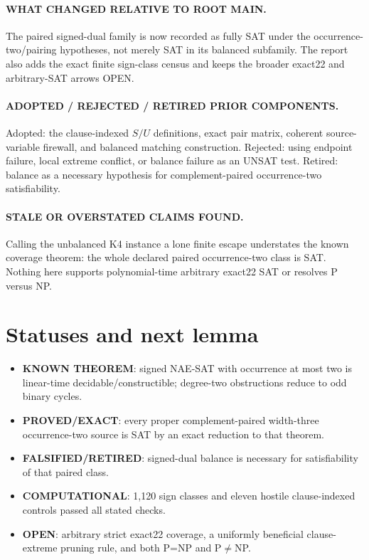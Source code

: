 \documentclass[11pt]{article}
\newcommand{\PROVED}{\textbf{PROVED/EXACT}}
\newcommand{\KNOWN}{\textbf{KNOWN THEOREM}}
\newcommand{\COMP}{\textbf{COMPUTATIONAL}}
\newcommand{\OPEN}{\textbf{OPEN}}
\newcommand{\FALSE}{\textbf{FALSIFIED/RETIRED}}
\begin{document}
\paragraph{WHAT CHANGED RELATIVE TO ROOT MAIN.}
The paired signed-dual family is now recorded as fully SAT under the
occurrence-two/pairing hypotheses, not merely SAT in its balanced subfamily.
The report also adds the exact finite sign-class census and keeps the broader
exact22 and arbitrary-SAT arrows OPEN.

\paragraph{ADOPTED / REJECTED / RETIRED PRIOR COMPONENTS.}
Adopted: the clause-indexed $S/U$ definitions, exact pair matrix, coherent
source-variable firewall, and balanced matching construction.  Rejected:
using endpoint failure, local extreme conflict, or balance failure as an UNSAT
test.  Retired: balance as a necessary hypothesis for complement-paired
occurrence-two satisfiability.

\paragraph{STALE OR OVERSTATED CLAIMS FOUND.}
Calling the unbalanced K4 instance a lone finite escape understates the known
coverage theorem: the whole declared paired occurrence-two class is SAT.
Nothing here supports polynomial-time arbitrary exact22 SAT or resolves
P versus NP.

\section{Statuses and next lemma}

\begin{itemize}
\item \KNOWN: signed NAE-SAT with occurrence at most two is linear-time
decidable/constructible; degree-two obstructions reduce to odd binary cycles.
\item \PROVED: every proper complement-paired width-three occurrence-two
source is SAT by an exact reduction to that theorem.
\item \FALSE: signed-dual balance is necessary for satisfiability of that
paired class.
\item \COMP: 1,120 sign classes and eleven hostile clause-indexed controls
passed all stated checks.
\item \OPEN: arbitrary strict exact22 coverage, a uniformly beneficial
clause-extreme pruning rule, and both P=NP and P$\ne$NP.
\end{itemize}
\end{document}
